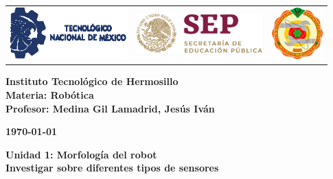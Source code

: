 \begin{titlepage}
	\centering
	\begin{tabular}{@{}p{} p{} p{}@{}}
		\includegraphics[height=2cm]{tecnm} & 
		\centering \includegraphics[height=1.5cm]{SEP} & 
		\raggedleft \includegraphics[height=2cm]{ith.jpg} \\
	\end{tabular}
	
	\vspace{2em}
	
	\noindent
	\begin{minipage}[t]{0.48\textwidth}
		\raggedright
		\small \textbf{%
			Instituto Tecnológico de Hermosillo\\
			Materia: Robótica\\
			Profesor: Medina Gil Lamadrid, Jesús Iván%
		}
	\end{minipage}%
	\hfill
	\begin{minipage}[t]{0.48\textwidth}
		\raggedleft
		\small \textbf{\today}
	\end{minipage}
	
	\vspace{2em}
	
	{\large \textbf{Unidad 1: Morfología del robot}}\\
	{\Huge \textbf{Investigar sobre diferentes tipos de sensores}}
		
	\vspace{1em}
	

\end{titlepage}
